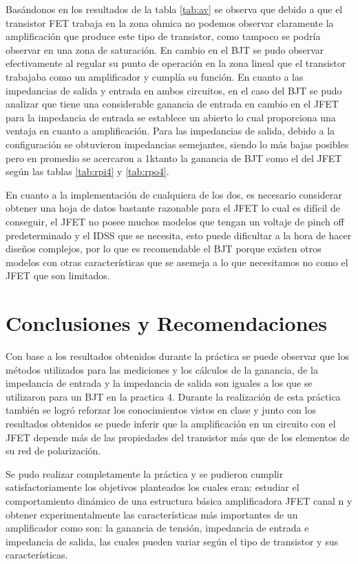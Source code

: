 \documentclass[12pt, a4paper]{article}
\begin{document}
    Basándonos en los resultados de la tabla \ref{tab:av} se observa que debido a que el transistor FET trabaja en la zona ohmica no podemos observar claramente la amplificación que produce este tipo de transistor, como tampoco se podría observar en una zona de saturación. En cambio en el BJT se pudo observar efectivamente al regular su punto de operación en la zona lineal que el transistor trabajaba como un amplificador y cumplía su función. En cuanto a las impedancias de salida y entrada en ambos circuitos, en el caso del BJT se pudo analizar que tiene una considerable ganancia de entrada en cambio en el JFET para la impedancia de entrada se establece un abierto lo cual proporciona una ventaja en cuanto a amplificación. Para las impedancias de salida, debido a la configuración se obtuvieron impedancias semejantes, siendo lo más bajas posibles pero en promedio se acercaron a 1k\Omega tanto la ganancia de BJT como el del JFET según las tablas \ref{tab:rpi4} y \ref{tab:rpo4}. 

    En cuanto a la implementación de cualquiera de los dos, es necesario considerar obtener una hoja de datos bastante razonable para el JFET lo cual es difícil de conseguir, el JFET no posee muchos modelos que tengan un voltaje de pinch off predeterminado y el IDSS que se necesita, esto puede dificultar a la hora de hacer diseños complejos, por lo que es recomendable el BJT porque existen otros modelos con otras características que se asemeja a lo que necesitamos no como el JFET que son limitados. 

    \newpage
    
    \section{Conclusiones y Recomendaciones}

    Con base a los resultados obtenidos durante la práctica se puede observar que los métodos utilizados para las mediciones y los cálculos de la ganancia, de la impedancia de entrada y la impedancia de salida son iguales a los que se utilizaron para un BJT en la practica 4. Durante la realización de esta práctica también se logró reforzar los conocimientos vistos en clase y junto con los resultados obtenidos se puede inferir que la amplificación en un circuito con el JFET depende más de las propiedades del transistor más que de los elementos de su red de polarización.

    Se pudo realizar completamente la práctica y se pudieron cumplir satisfactoriamente los objetivos planteados los cuales eran: estudiar el comportamiento dinámico de una estructura básica amplificadora JFET canal n y obtener experimentalmente las características más importantes de un amplificador como son: la ganancia de tensión, impedancia de entrada e impedancia de salida, las cuales pueden variar según el tipo de transistor y sus características.
\end{document}
